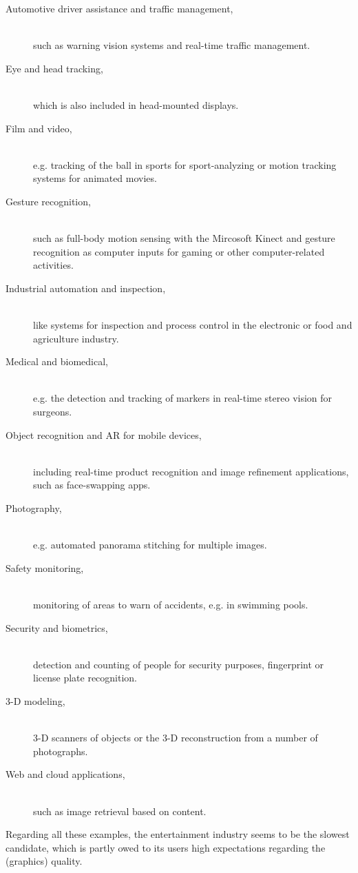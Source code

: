 \begin{description}
\item [Automotive driver assistance and traffic management,]\hfill \\ such as warning vision systems and real-time traffic management.
\item [Eye and head tracking,]\hfill \\ which is also included in head-mounted displays.
\item [Film and video,]\hfill \\ e.g. tracking of the ball in sports for sport-analyzing or motion tracking systems for animated movies.
\item [Gesture recognition,]\hfill \\ such as full-body motion sensing with the Mircosoft Kinect and gesture recognition as computer inputs for gaming or other computer-related activities.
\item [Industrial automation and inspection,]\hfill \\ like systems for inspection and process control in the electronic or food and agriculture industry. 
\item [Medical and biomedical,]\hfill \\ e.g. the detection and tracking of markers in real-time stereo vision for surgeons.
\item [Object recognition and AR for mobile devices,]\hfill \\ including real-time product recognition and image refinement applications, such as face-swapping apps.
\item [Photography,]\hfill \\ e.g. automated panorama stitching for multiple images.
\item [Safety monitoring,]\hfill \\ monitoring of areas to warn of accidents, e.g. in swimming pools.
\item [Security and biometrics,]\hfill \\ detection and counting of people for security purposes, fingerprint or license plate recognition.
\item [3-D modeling,]\hfill \\ 3-D scanners of objects or the 3-D reconstruction from a number of photographs. 
\item [Web and cloud applications,]\hfill \\ such as image retrieval based on content. 
\end{description}

Regarding all these examples, the entertainment industry seems to be the slowest candidate, which is partly owed to its users high expectations regarding the (graphics) quality. 
